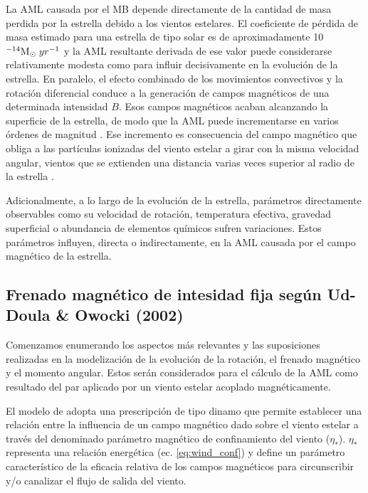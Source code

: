 La AML causada por el MB depende directamente de la cantidad de masa perdida por la estrella debido a los vientos estelares. El coeficiente de pérdida de masa estimado para una estrella de tipo solar es de aproximadamente 10$^{-14} \mathrm{M}_\odot \; yr^{-1}$ \citep{Noerdlinger2008} y la AML resultante derivada de ese valor puede considerarse relativamente modesta como para influir decisivamente en la evolución de la estrella. En paralelo, el efecto combinado de los movimientos convectivos y la rotación diferencial conduce a la generación de campos magnéticos de una determinada intensidad $B$. Esos campos magnéticos acaban alcanzando la superficie de la estrella, de modo que la AML puede incrementarse en varios órdenes de magnitud \citep{Langer2012}. Ese incremento es consecuencia del campo magnético que obliga a las partículas ionizadas del viento estelar a girar con la misma velocidad angular, vientos que se extienden una distancia varias veces superior al radio de la estrella \citep{UdDoula2002,Ud-Doula2007,Ud-Doula2008}.\par

Adicionalmente, a lo largo de la evolución de la estrella, parámetros directamente observables como su velocidad de rotación, temperatura efectiva, gravedad superficial o abundancia de elementos químicos sufren variaciones. Estos parámetros influyen, directa o indirectamente, en la AML causada por el campo magnético de la estrella.\par


\subsection{Frenado magnético de intesidad fija según Ud-Doula \& Owocki (2002)} \label{sec:mod_mb}
Comenzamos enumerando los aspectos más relevantes y las suposiciones realizadas en la modelización de la evolución de la rotación, el frenado magnético y el momento angular. Estos serán considerados para el cálculo de la AML como resultado del par aplicado por un viento estelar acoplado magnéticamente.\par 

El modelo de \cite{UdDoula2002} adopta una prescripción de tipo dinamo que permite establecer una relación entre la influencia de un campo magnético dado sobre el viento estelar a través del denominado parámetro magnético de confinamiento del viento ($\eta_*$). $\eta_*$ representa una relación energética (ec. \ref{eq:wind_conf}) y define un parámetro característico de la eficacia relativa de los campos magnéticos para circunscribir y/o canalizar el flujo de salida del viento.\par


